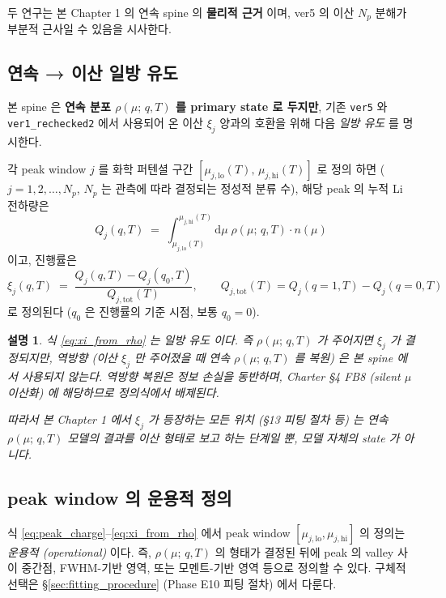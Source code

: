\documentclass[11pt,a4paper]{article}
\newtheorem*{note}{설명}
\newcommand{\dd}{\mathrm{d}}
\newcommand{\tot}{\mathrm{tot}}
\newcommand{\mucont}{\mu}
\newcommand{\rhomu}{\rho(\mucont;\, q, T)}
\newcommand{\nmu}{n(\mucont)}
\begin{document}
두 연구는 본 Chapter 1 의 연속 spine 의 \textbf{물리적 근거} 이며, ver5 의 이산
$N_p$ 분해가 부분적 근사일 수 있음을 시사한다.

\subsection{연속 → 이산 일방 유도}
\label{sec:continuous_to_discrete}

본 spine 은 \textbf{연속 분포 $\rhomu$ 를 primary state 로 두지만}, 기존
\texttt{ver5} 와 \texttt{ver1\_rechecked2} 에서 사용되어 온 이산 $\xi_j$ 양과의
호환을 위해 다음 \emph{일방 유도} 를 명시한다.

각 peak window $j$ 를 화학 퍼텐셜 구간 $[\mucont_{j,\mathrm{lo}}(T),\,
\mucont_{j,\mathrm{hi}}(T)]$ 로 정의 하면 ($j = 1, 2, \ldots, N_p$, $N_p$ 는
관측에 따라 결정되는 정성적 분류 수), 해당 peak 의 누적 Li 전하량은
\begin{equation}
Q_j(q, T)
\;=\;
\int_{\mucont_{j,\mathrm{lo}}(T)}^{\mucont_{j,\mathrm{hi}}(T)} \dd\mucont \;
\rhomu \cdot \nmu
\label{eq:peak_charge}
\end{equation}
이고, 진행률은
\begin{equation}
\xi_j(q, T)
\;=\;
\frac{Q_j(q, T) - Q_j(q_0, T)}{Q_{j,\tot}(T)},
\qquad
Q_{j,\tot}(T) = Q_j(q = 1, T) - Q_j(q = 0, T)
\label{eq:xi_from_rho}
\end{equation}
로 정의된다 ($q_0$ 은 진행률의 기준 시점, 보통 $q_0 = 0$).

\begin{note}
식 \eqref{eq:xi_from_rho} 는 \emph{일방 유도} 이다. 즉 $\rhomu$ 가 주어지면 $\xi_j$
가 결정되지만, 역방향 (이산 $\xi_j$ 만 주어졌을 때 연속 $\rhomu$ 를 복원) 은 본
spine 에서 사용되지 않는다. 역방향 복원은 정보 손실을 동반하며, Charter \S 4 FB8
(silent $\mucont$ 이산화) 에 해당하므로 정의식에서 배제된다.

따라서 본 Chapter 1 에서 $\xi_j$ 가 등장하는 모든 위치 (\S 13 피팅 절차 등) 는
연속 $\rhomu$ 모델의 결과를 이산 형태로 \emph{보고} 하는 단계일 뿐, 모델 자체의
state 가 아니다.
\end{note}

\subsection{peak window 의 운용적 정의}
\label{sec:peak_window_operational}

식 \eqref{eq:peak_charge}--\eqref{eq:xi_from_rho} 에서 peak window
$[\mucont_{j,\mathrm{lo}}, \mucont_{j,\mathrm{hi}}]$ 의 정의는 \emph{운용적
(operational)} 이다. 즉, $\rhomu$ 의 형태가 결정된 뒤에 peak 의 valley 사이
중간점, FWHM-기반 영역, 또는 모멘트-기반 영역 등으로 정의할 수 있다. 구체적
선택은 \S\ref{sec:fitting_procedure} (Phase E10 피팅 절차) 에서 다룬다.
\end{document}
